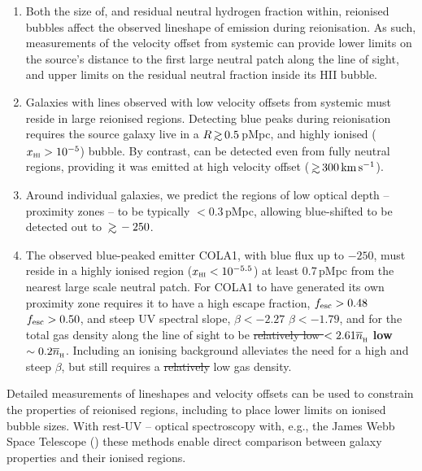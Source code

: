 \documentclass[fleqn,usenatbib]{mnras}
\providecommand{\DIFadd}[1]{{\protect\color{Green} {\bf #1}}} %
\providecommand{\DIFdel}[1]{{\protect\color{Gray} \scriptsize \sout{#1}}} %
\providecommand{\DIFaddbegin}{} %
\providecommand{\DIFaddend}{} %
\providecommand{\DIFdelbegin}{} %
\providecommand{\DIFdelend}{} %
\newcommand{\DIFscaledelfig}{0.5}
\newlength{\DIFdelgraphicswidth} %
\newlength{\DIFdelgraphicsheight} %
\newcommand{\DIFaddincludegraphics}[2][]{{\color{purple}\fbox{\DIFOincludegraphics[#1]{#2}}}} %
\newcommand{\DIFdelincludegraphics}[2][]{%
\sbox{\DIFdelgraphicsbox}{\DIFOincludegraphics[#1]{#2}}%
\settoboxwidth{\DIFdelgraphicswidth}{\DIFdelgraphicsbox} %
\settoboxtotalheight{\DIFdelgraphicsheight}{\DIFdelgraphicsbox} %
\scalebox{\DIFscaledelfig}{%
\parbox[b]{\DIFdelgraphicswidth}{\usebox{\DIFdelgraphicsbox}\\[-\baselineskip] \rule{\DIFdelgraphicswidth}{0em}}\llap{\resizebox{\DIFdelgraphicswidth}{\DIFdelgraphicsheight}{%
\setlength{\unitlength}{\DIFdelgraphicswidth}%
\begin{picture}(1,1)%
\thicklines\linethickness{2pt} %
{\color[rgb]{1,0,0}\put(0,0){\framebox(1,1){}}}%
{\color[rgb]{1,0,0}\put(0,0){\line( 1,1){1}}}%
{\color[rgb]{1,0,0}\put(0,1){\line(1,-1){1}}}%
\end{picture}%
}\hspace*{3pt}}} %
} %
\DeclareRobustCommand{\DIFaddbegin}{\DIFOaddbegin \let\includegraphics\DIFaddincludegraphics} %
\DeclareRobustCommand{\DIFaddend}{\DIFOaddend \let\includegraphics\DIFOincludegraphics} %
\DeclareRobustCommand{\DIFdelbegin}{\DIFOdelbegin \let\includegraphics\DIFdelincludegraphics} %
\DeclareRobustCommand{\DIFdelend}{\DIFOaddend \let\includegraphics\DIFOincludegraphics} %
\begin{document}
\begin{enumerate}
    \item Both the size of, and residual neutral hydrogen fraction within, reionised bubbles affect the observed lineshape of \lya emission during reionisation. As such, measurements of the \lya velocity offset from systemic can provide lower limits on the source's distance to the first large neutral patch along the line of sight, and upper limits on the residual neutral fraction inside its HII bubble.
    \item Galaxies with \lya lines observed with low velocity offsets from systemic must reside in large reionised regions. Detecting blue \lya peaks during reionisation requires the source galaxy live in a $R\simgt 0.5$\,pMpc, and highly ionised ($\xHI > 10^{-5}$) bubble. By contrast, \lya can be detected even from fully neutral regions, providing it was emitted at high velocity offset ($\simgt 300\kms$).
    \item Around individual galaxies, we predict the regions of low \lya optical depth -- proximity zones -- to be typically $<0.3$\,pMpc, allowing blue-shifted \lya to be detected out to $\simgt -250$\kms.
    \item The observed blue-peaked \lya emitter COLA1, with blue flux up to $-250$\kms, must reside in a highly ionised region ($\xHI < 10^{-5.5}$) at least 0.7\,pMpc from the nearest large scale neutral patch. For COLA1 to have generated its own proximity zone requires it to have a high escape fraction, \DIFdelbegin \DIFdel{$\fesc > 0.48$}\DIFdelend \DIFaddbegin \DIFadd{$\fesc > 0.50$}\DIFaddend , and steep UV spectral slope, \DIFdelbegin \DIFdel{$\beta < -2.27$}\DIFdelend \DIFaddbegin \DIFadd{$\beta < -1.79$}\DIFaddend , and for the total gas density along the line of sight to be \DIFdelbegin \DIFdel{relatively low $<2.61\nh$}\DIFdelend \DIFaddbegin \DIFadd{low $\sim0.2\nh$}\DIFaddend . Including an ionising background alleviates the need for a high \fesc and steep $\beta$, but still requires a \DIFdelbegin \DIFdel{relatively }\DIFdelend low gas density.
\end{enumerate}

Detailed measurements of \lya lineshapes and velocity offsets can be used to constrain the properties of reionised regions, including to place lower limits on ionised bubble sizes. With rest-UV -- optical spectroscopy with, e.g., the James Webb Space Telescope (\JWST) these methods enable direct comparison between galaxy properties and their ionised regions.
\end{document}
